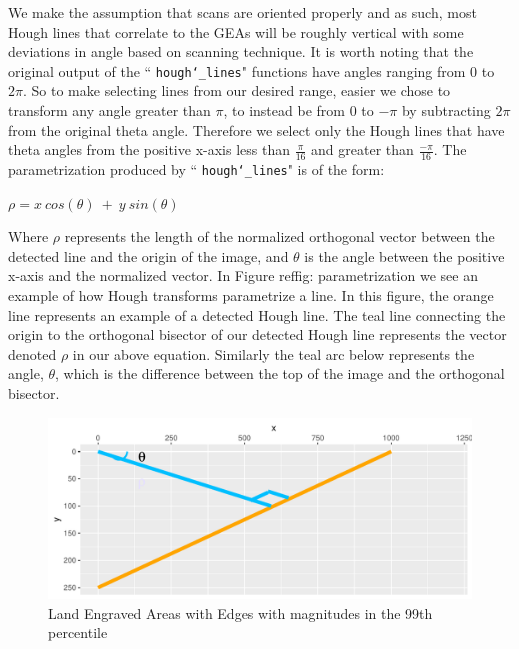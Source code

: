 \documentclass[12pt]{article}\usepackage[]{graphicx}\usepackage[]{color}
\makeatletter
\def\maxwidth{ %
  \ifdim\Gin@nat@width>\linewidth
    \linewidth
  \else
    \Gin@nat@width
  \fi
}
\newenvironment{knitrout}{}{} %
\theoremstyle{nonumberplain}
\makeatother
\begin{document}
We make the assumption that scans are oriented properly and as such, most Hough lines that correlate to the GEAs will be roughly vertical with some deviations in angle based on scanning technique. It is worth noting that the original output of the `` \texttt{hough\char`_lines}" functions have angles ranging from 0 to $2\pi$. So to make selecting lines from our desired range, easier we chose to transform any angle greater than $\pi$, to instead be from 0 to $-\pi$ by subtracting $2\pi$ from the original theta angle. Therefore we select only the Hough lines that have theta angles from the positive x-axis less than $\frac{\pi}{16}$ and greater than $\frac{-\pi}{16}$. The parametrization produced by `` \texttt{hough\char`_lines}" is of the form:

\begin{center}
$\rho = x \ cos(\theta) \ + \ y \ sin(\theta)$
\end{center}

Where $\rho$ represents the length of the normalized orthogonal vector between the detected line and the origin of the image, and $\theta$ is the angle between the positive x-axis and the normalized vector. In Figure ref{fig: parametrization} we see an example of how Hough transforms parametrize a line. In this figure, the orange line represents an example of a detected Hough line. The teal line connecting the origin to the orthogonal bisector of our detected Hough line represents the vector denoted $\rho$ in our above equation. Similarly the teal arc below represents the angle, $\theta$, which is the difference between the top of the image and the orthogonal bisector. 

\begin{knitrout}
\color{fgcolor}\begin{figure}

{\centering \includegraphics[width=\maxwidth]{figure/r_hessian-example-1} 

}

\caption[Land Engraved Areas with Edges with magnitudes in the 99th percentile]{Land Engraved Areas with Edges with magnitudes in the 99th percentile}\label{fig:r hessian-example}
\end{figure}


\end{knitrout}
% 
\end{document}
